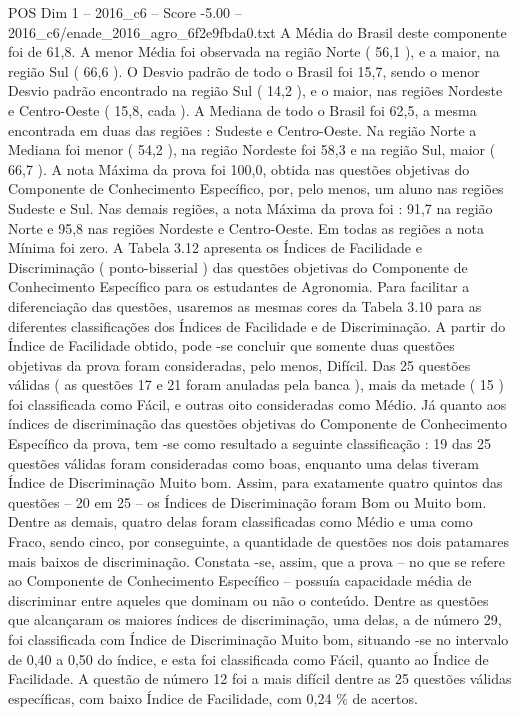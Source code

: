 \begin{textsample}{POS Dim 1 – 2016\_c6 – Score -5.00 – 2016\_c6/enade\_2016\_agro\_6f2e9fbda0.txt}
A Média do Brasil deste componente foi de 61,8.
A menor Média foi observada na região Norte ( 56,1 ), e a maior, na região Sul ( 66,6 ).
O Desvio padrão de todo o Brasil foi 15,7, sendo o menor Desvio padrão encontrado na região Sul ( 14,2 ), e o maior, nas regiões Nordeste e Centro-Oeste ( 15,8, cada ).
A Mediana de todo o Brasil foi 62,5, a mesma encontrada em duas das regiões : Sudeste e Centro-Oeste.
Na região Norte a Mediana foi menor ( 54,2 ), na região Nordeste foi 58,3 e na região Sul, maior ( 66,7 ).
A nota Máxima da prova foi 100,0, obtida nas questões objetivas do Componente de Conhecimento Específico, por, pelo menos, um aluno nas regiões Sudeste e Sul.
Nas demais regiões, a nota Máxima da prova foi : 91,7 na região Norte e 95,8 nas regiões Nordeste e Centro-Oeste.
Em todas as regiões a nota Mínima foi zero.
A Tabela 3.12 apresenta os Índices de Facilidade e Discriminação ( ponto-bisserial ) das questões objetivas do Componente de Conhecimento Específico para os estudantes de Agronomia.
Para facilitar a diferenciação das questões, usaremos as mesmas cores da Tabela 3.10 para as diferentes classificações dos Índices de Facilidade e de Discriminação.
A partir do Índice de Facilidade obtido, pode -se concluir que somente duas questões objetivas da prova foram consideradas, pelo menos, Difícil.
Das 25 questões válidas ( as questões 17 e 21 foram anuladas pela banca ), mais da metade ( 15 ) foi classificada como Fácil, e outras oito consideradas como Médio.
Já quanto aos índices de discriminação das questões objetivas do Componente de Conhecimento Específico da prova, tem -se como resultado a seguinte classificação : 19 das 25 questões válidas foram consideradas como boas, enquanto uma delas tiveram Índice de Discriminação Muito bom.
Assim, para exatamente quatro quintos das questões – 20 em 25 – os Índices de Discriminação foram Bom ou Muito bom.
Dentre as demais, quatro delas foram classificadas como Médio e uma como Fraco, sendo cinco, por conseguinte, a quantidade de questões nos dois patamares mais baixos de discriminação.
Constata -se, assim, que a prova – no que se refere ao Componente de Conhecimento Específico – possuía capacidade média de discriminar entre aqueles que dominam ou não o conteúdo.
Dentre as questões que alcançaram os maiores índices de discriminação, uma delas, a de número 29, foi classificada com Índice de Discriminação Muito bom, situando -se no intervalo de 0,40 a 0,50 do índice, e esta foi classificada como Fácil, quanto ao Índice de Facilidade.
A questão de número 12 foi a mais difícil dentre as 25 questões válidas específicas, com baixo Índice de Facilidade, com 0,24 \% de acertos.

\end{textsample}
